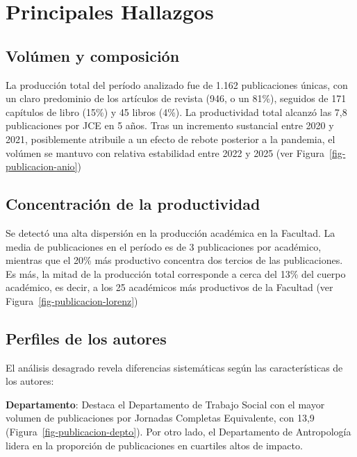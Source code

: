 \documentclass[
  a4paper,
  oneside]{scrbook}
\begin{document}
\section*{Principales Hallazgos}\label{principales-hallazgos}


\subsection*{Volúmen y composición}\label{voluxfamen-y-composiciuxf3n}

La producción total del período analizado fue de 1.162 publicaciones
únicas, con un claro predominio de los artículos de revista (946, o un
81\%), seguidos de 171 capítulos de libro (15\%) y 45 libros (4\%). La
productividad total alcanzó las 7,8 publicaciones por JCE en 5 años.
Tras un incremento sustancial entre 2020 y 2021, posiblemente atribuile
a un efecto de rebote posterior a la pandemia, el volúmen se mantuvo con
relativa estabilidad entre 2022 y 2025 (ver
Figura~\ref{fig-publicacion-anio})

\subsection*{Concentración de la
productividad}\label{concentraciuxf3n-de-la-productividad}

Se detectó una alta dispersión en la producción académica en la
Facultad. La media de publicaciones en el período es de 3 publicaciones
por académico, mientras que el 20\% más productivo concentra dos tercios
de las publicaciones. Es más, la mitad de la producción total
corresponde a cerca del 13\% del cuerpo académico, es decir, a los 25
académicos más productivos de la Facultad (ver
Figura~\ref{fig-publicacion-lorenz})

\subsection*{Perfiles de los autores}\label{perfiles-de-los-autores}

El análisis desagrado revela diferencias sistemáticas según las
características de los autores:

\textbf{Departamento}: Destaca el Departamento de Trabajo Social con el
mayor volumen de publicaciones por Jornadas Completas Equivalente, con
13,9 (Figura~\ref{fig-publicacion-depto}). Por otro lado, el
Departamento de Antropología lidera en la proporción de publicaciones en
cuartiles altos de impacto.
\end{document}

